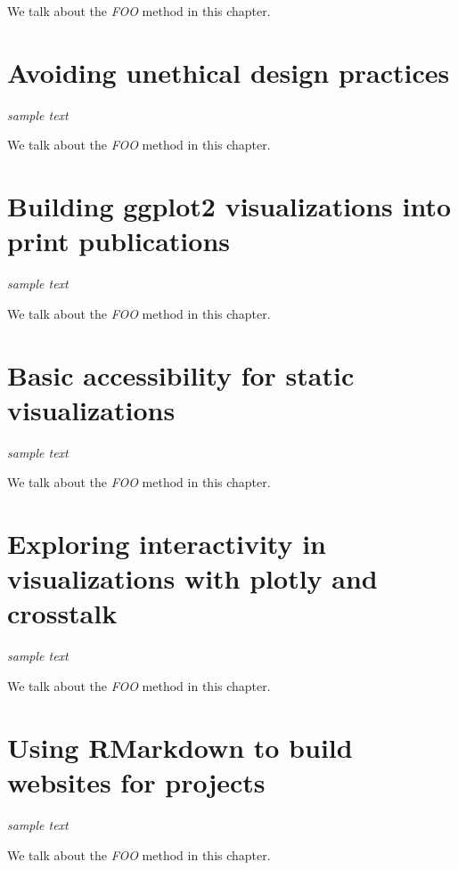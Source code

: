 \documentclass[
]{krantz}
\begin{document}
We talk about the \emph{FOO} method in this chapter.

\hypertarget{ethical-design-practices}{%
\chapter{Avoiding unethical design practices}\label{ethical-design-practices}}

\emph{sample text}

We talk about the \emph{FOO} method in this chapter.

\hypertarget{print-publications}{%
\chapter{Building ggplot2 visualizations into print publications}\label{print-publications}}

\emph{sample text}

We talk about the \emph{FOO} method in this chapter.

\hypertarget{accessibility-for-visualizations}{%
\chapter{Basic accessibility for static visualizations}\label{accessibility-for-visualizations}}

\emph{sample text}

We talk about the \emph{FOO} method in this chapter.

\hypertarget{interactive-visualizations}{%
\chapter{Exploring interactivity in visualizations with plotly and crosstalk}\label{interactive-visualizations}}

\emph{sample text}

We talk about the \emph{FOO} method in this chapter.

\hypertarget{rmarkdown-websites}{%
\chapter{Using RMarkdown to build websites for projects}\label{rmarkdown-websites}}

\emph{sample text}

We talk about the \emph{FOO} method in this chapter.
\end{document}
